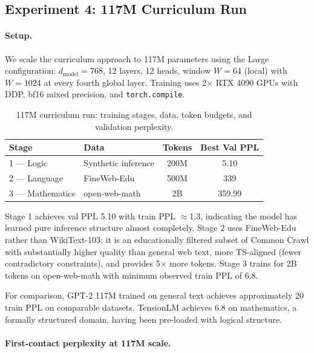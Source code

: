 \documentclass[10pt,a4paper]{article}
\begin{document}
\subsection{Experiment 4: 117M Curriculum Run}

\paragraph{Setup.} We scale the curriculum approach to 117M parameters using the Large configuration: $d_{\text{model}} = 768$, 12 layers, 12 heads, window $W = 64$ (local) with $W = 1024$ at every fourth global layer. Training uses 2$\times$ RTX 4090 GPUs with DDP, bf16 mixed precision, and \texttt{torch.compile}.

\begin{table}[h]
\centering
\caption{117M curriculum run: training stages, data, token budgets, and validation perplexity.}
\label{tab:exp4stages}
\vspace{4pt}
\begin{tabular}{llcc}
\toprule
Stage & Data & Tokens & Best Val PPL \\
\midrule
1 --- Logic & Synthetic inference & 200M & 5.10 \\
2 --- Language & FineWeb-Edu \cite{penedo2024fineweb} & 500M & 339 \\
3 --- Mathematics & open-web-math & 2B & 359.99 \\
\bottomrule
\end{tabular}
\end{table}

Stage 1 achieves val PPL 5.10 with train PPL $\approx$1.3, indicating the model has learned pure inference structure almost completely. Stage 2 uses FineWeb-Edu rather than WikiText-103: it is an educationally filtered subset of Common Crawl with substantially higher quality than general web text, more TS-aligned (fewer contradictory constraints), and provides 5$\times$ more tokens. Stage 3 trains for 2B tokens on open-web-math with minimum observed train PPL of 6.8.

For comparison, GPT-2 117M \cite{radford2019language} trained on general text achieves approximately 20 train PPL on comparable datasets. TensionLM achieves 6.8 on mathematics, a formally structured domain, having been pre-loaded with logical structure.

\paragraph{First-contact perplexity at 117M scale.}
\end{document}

